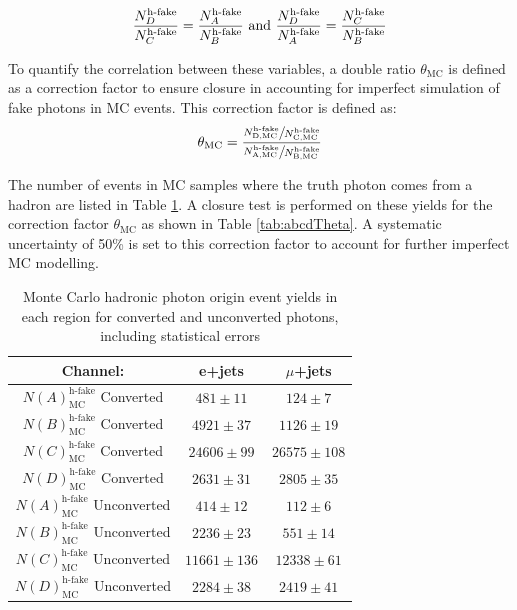 \[\frac{N_D^{\text{h-fake}}}{N_C^{\text{h-fake}}}=\frac{N_A^{\text{h-fake}}}{N_B^{\text{h-fake}}}
\\ \text{ and } \\
\frac{N_D^{\text{h-fake}}}{N_A^{\text{h-fake}}}=\frac{N_C^{\text{h-fake}}}{N_B^{\text{h-fake}}}
\]

To quantify the correlation between these variables, a double ratio $\theta_{\text{MC}}$ is defined as a correction factor to ensure closure in accounting for imperfect simulation of fake photons in MC events. This correction factor is defined as:
\[\theta_{\text{MC}}=\frac
{\sfrac{N_\text{D,MC}^{\text{h-fake}}}{N_\text{C,MC}^{\text{h-fake}}}}
{\sfrac{N_\text{A,MC}^{\text{h-fake}}}{N_\text{B,MC}^{\text{h-fake}}}}
\]
 
 The number of events in MC samples where the truth photon comes from a hadron are listed in Table \ref{tab:abcdYieldsMC}.  A closure test is performed on these yields for the correction factor $\theta_\text{MC}$ as shown in Table \ref{tab:abcdTheta}.  A systematic uncertainty of 50\% is set to this correction factor to account for further imperfect MC modelling.
\begin{table}[h]
\begin{center}
{\renewcommand{\arraystretch}{1.2}
\begin{tabular}{c|c|c}
\hline
Channel:     &  e+jets   &$\mu$+jets \\  \hline 
$N(A)^\text{h-fake}_\text{MC}$ Converted & $481 \pm 11 $   &  $124\pm 7$	\\ 
$N(B)^\text{h-fake}_\text{MC}$ Converted & $4921 \pm 37 $   &  $1126\pm 19 $      \\ 
$N(C)^\text{h-fake}_\text{MC}$ Converted & $24606 \pm 99 $   &  $26575\pm 108 $    \\ 
$N(D)^\text{h-fake}_\text{MC}$ Converted & $2631 \pm 31 $   &  $2805\pm 35$      \\ \hline
$N(A)^\text{h-fake}_\text{MC}$ Unconverted & $414\pm 12$         &  $112\pm 6$	\\ 
$N(B)^\text{h-fake}_\text{MC}$ Unconverted & $2236\pm 23$       &  $551 \pm 14$       \\ 
$N(C)^\text{h-fake}_\text{MC}$ Unconverted & $11661\pm 136$   &  $12338\pm61$     \\ 
$N(D)^\text{h-fake}_\text{MC}$ Unconverted & $2284\pm38$        &  $2419 \pm 41$       \\ \hline
\end{tabular}
\caption{Monte Carlo hadronic photon origin event yields in each region for converted and unconverted photons, including statistical errors  }
\label{tab:abcdYieldsMC}
}
\end{center}
\end{table}

